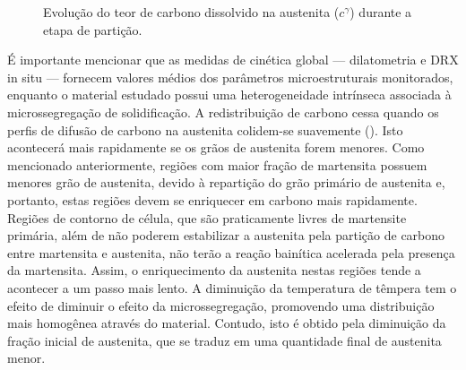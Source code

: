 \begin{figure}
  \vspace{0pt}
  \caption{Evolução do teor de carbono dissolvido na austenita ($c^\gamma$) durante a etapa de partição.}
  \label{fig:XTMS_wC}
\end{figure}

É importante mencionar que as medidas de cinética global --- dilatometria e DRX in situ --- fornecem valores médios dos parâmetros microestruturais monitorados, enquanto o material estudado possui uma heterogeneidade intrínseca associada à microssegregação de solidificação. A redistribuição de carbono cessa quando os perfis de difusão de carbono na austenita colidem-se suavemente (). Isto acontecerá mais rapidamente se os grãos de austenita forem menores. Como mencionado anteriormente, regiões com maior fração de martensita possuem menores grão de austenita, devido à repartição do grão primário de austenita e, portanto, estas regiões devem se enriquecer em carbono mais rapidamente. Regiões de contorno de célula, que são praticamente livres de martensite primária, além de não poderem estabilizar a austenita pela partição de carbono entre martensita e austenita, não terão a reação bainítica acelerada pela presença da martensita. Assim, o enriquecimento da austenita nestas regiões tende a acontecer a um passo mais lento. A diminuição da temperatura de têmpera tem o efeito de diminuir o efeito da microssegregação, promovendo uma distribuição mais homogênea através do material. Contudo, isto é obtido pela diminuição da fração inicial de austenita, que se traduz em uma quantidade final de austenita menor.

